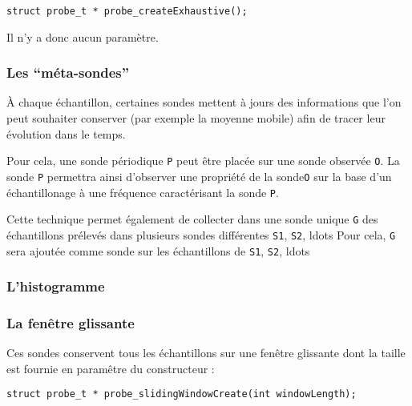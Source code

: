 \documentclass{article}
\begin{document}
\begin{verbatim}
struct probe_t * probe_createExhaustive();  
\end{verbatim}

   Il n'y a donc aucun paramètre.

%
\subsubsection{Les ``méta-sondes''}

   À chaque échantillon, certaines sondes mettent à jours des
informations que l'on peut souhaiter conserver (par exemple la moyenne
mobile) afin de tracer leur évolution dans le temps.

   Pour cela, une sonde périodique \lstinline!P! peut être placée sur
une sonde observée \lstinline!O!. La sonde \lstinline!P! permettra
ainsi d'observer une propriété de la sonde\lstinline!O! sur la base
d'un échantillonage à une fréquence caractérisant la sonde
\lstinline!P!. 

   Cette technique permet également de collecter dans une sonde unique
\lstinline!G! des échantillons prélevés dans plusieurs sondes
différentes \lstinline!S1!, \lstinline!S2!, ldots Pour cela,
\lstinline!G! sera ajoutée comme sonde sur les échantillons de
\lstinline!S1!, \lstinline!S2!, ldots 

%
\subsubsection{L'histogramme}

%
\subsubsection{La fenêtre glissante}

   Ces sondes conservent tous les échantillons sur une fenêtre
glissante dont la taille est fournie en paramêtre du constructeur :

\begin{verbatim}
struct probe_t * probe_slidingWindowCreate(int windowLength);
\end{verbatim}
\end{document}
